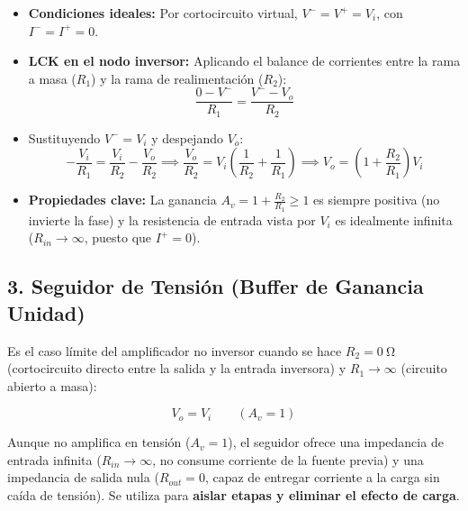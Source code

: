 \begin{itemize}[leftmargin=*]
    \item \textbf{Condiciones ideales:} Por cortocircuito virtual, $V^- = V^+ = V_i$, con $I^- = I^+ = 0$.
    \item \textbf{LCK en el nodo inversor:} Aplicando el balance de corrientes entre la rama a masa ($R_1$) y la rama de realimentación ($R_2$):
    \begin{equation}
        \frac{0 - V^-}{R_1} = \frac{V^- - V_o}{R_2}
    \end{equation}
    \item Sustituyendo $V^- = V_i$ y despejando $V_o$:
    \begin{equation}
        -\frac{V_i}{R_1} = \frac{V_i}{R_2} - \frac{V_o}{R_2} \implies \frac{V_o}{R_2} = V_i \left(\frac{1}{R_2} + \frac{1}{R_1}\right) \implies \boxed{V_o = \left(1 + \frac{R_2}{R_1}\right) V_i}
    \end{equation}
    \item \textbf{Propiedades clave:} La ganancia $A_v = 1 + \frac{R_2}{R_1} \ge 1$ es siempre positiva (no invierte la fase) y la resistencia de entrada vista por $V_i$ es idealmente infinita ($R_{in} \to \infty$, puesto que $I^+ = 0$).
\end{itemize}

\subsection{3. Seguidor de Tensión (Buffer de Ganancia Unidad)}

Es el caso límite del amplificador no inversor cuando se hace $R_2 = 0\ \si{\ohm}$ (cortocircuito directo entre la salida y la entrada inversora) y $R_1 \to \infty$ (circuito abierto a masa):

\begin{center}
\end{center}

\begin{equation}
    \boxed{V_o = V_i \qquad (A_v = 1)}
\end{equation}
\begin{aviso}
Aunque no amplifica en tensión ($A_v = 1$), el seguidor ofrece una impedancia de entrada infinita ($R_{in} \to \infty$, no consume corriente de la fuente previa) y una impedancia de salida nula ($R_{out} = 0$, capaz de entregar corriente a la carga sin caída de tensión). Se utiliza para \textbf{aislar etapas y eliminar el efecto de carga}.
\end{aviso}


